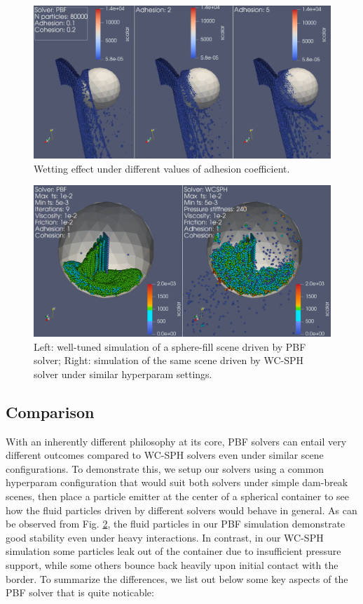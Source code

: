 \documentclass[
	11pt, 
	DIV10,
	ngerman,
	a4paper, 
	oneside, 
	headings=normal, 
	captions=tableheading,
	final, 
	numbers=noenddot
]{scrartcl}
\begin{document}
\begin{figure}[h]
    \centering
    \includegraphics[width=.6\textwidth]{pics/adhesion.png}
    \caption{Wetting effect under different values of adhesion coefficient.}
    \label{fig:wetting}
\end{figure}

\begin{figure}[h]
	\centering
    \includegraphics[width=.6\textwidth]{pics/comparison.png}
    \caption{Left: well-tuned simulation of a sphere-fill scene driven by PBF solver; Right: simulation of the same scene driven by WC-SPH solver under similar hyperparam settings.}
    \label{fig:comparison}
\end{figure}

\subsection{Comparison}

With an inherently different philosophy at its core, PBF solvers can entail very different outcomes compared to WC-SPH solvers even under similar scene configurations. To demonstrate this, we setup our solvers using a common hyperparam configuration that would suit both solvers under simple dam-break scenes, then place a particle emitter at the center of a spherical container to see how the fluid particles driven by different solvers would behave in general. As can be observed from Fig. \ref{fig:comparison}, the fluid particles in our PBF simulation demonstrate good stability even under heavy interactions. In contrast, in our WC-SPH simulation some particles leak out of the container due to insufficient pressure support, while some others bounce back heavily upon initial contact with the border. To summarize the differences, we list out below some key aspects of the PBF solver that is quite noticable:
\end{document}

